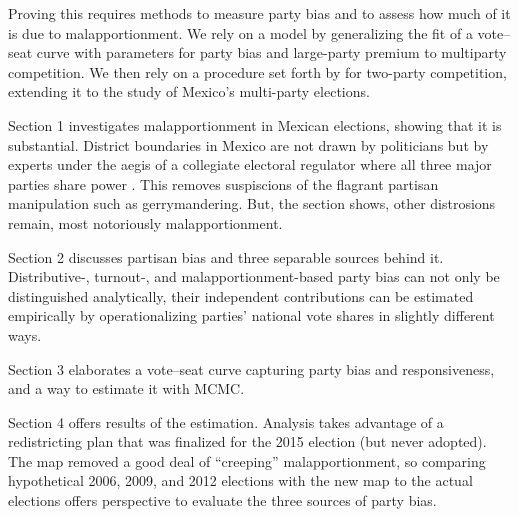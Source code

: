 \documentclass[letter,12pt]{article}
\begin{document}
Proving this requires methods to measure party bias and to assess how much of it is due to malapportionment. We rely on a model by \citet{king.1990elRespBiasMultiparty} generalizing the fit of a vote--seat curve with parameters for party bias and large-party premium to multiparty competition. We then rely on a procedure set forth by \citet{grofman.etalBiasMalapp.1997} for two-party competition, extending it to the study of Mexico's multi-party elections. 

Section 1 investigates malapportionment in Mexican elections, showing that it is substantial. District boundaries in Mexico are not drawn by politicians but by experts under the aegis of a collegiate electoral regulator where all three major parties share power \citep{estevez.magar.rosas.2008}. This removes suspiscions of the flagrant partisan manipulation such as gerrymandering. But, the section shows, other distrosions remain, most notoriously malapportionment. 

Section 2 discusses partisan bias and three separable sources behind it. Distributive-, turnout-, and malapportionment-based party bias can not only be distinguished analytically, their independent contributions can be estimated empirically by operationalizing parties' national vote shares in slightly different ways. 

Section 3 elaborates a vote--seat curve capturing party bias and responsiveness, and a way to estimate it with MCMC. 

Section 4 offers results of the estimation. Analysis takes advantage of a redistricting plan that was finalized for the 2015 election (but never adopted). The map removed a good deal of ``creeping'' malapportionment, so comparing hypothetical 2006, 2009, and 2012 elections with the new map to the actual elections offers perspective to evaluate the three sources of party bias. 


\end{document}
